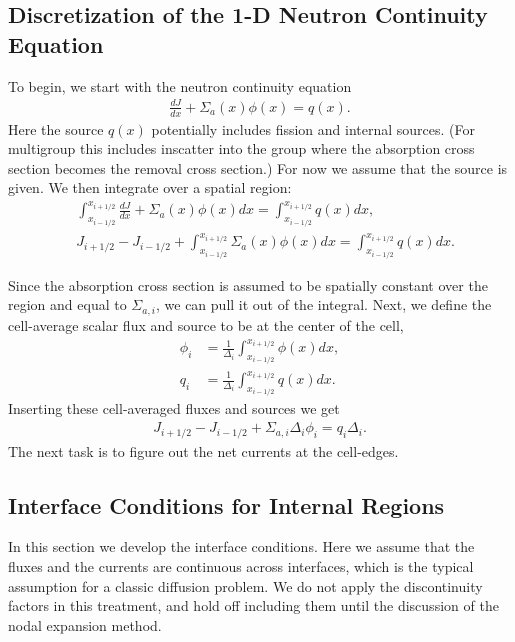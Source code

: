 \subsection{Discretization of the 1-D Neutron Continuity Equation}

To begin, we start with the neutron continuity equation
\begin{align}
  \frac{dJ}{dx} + \Sigma_a(x) \phi(x) = q(x) .
\end{align}
Here the source $q(x)$ potentially includes fission and internal sources. (For multigroup this includes inscatter into the group where the absorption cross section becomes the removal cross section.) For now we assume that the source is given. We then integrate over a spatial region:
\begin{align}
  &\int_{x_{i-1/2}}^{x_{i+1/2}} \frac{dJ}{dx} + \Sigma_a(x) \phi(x) dx = \int_{x_{i-1/2}}^{x_{i+1/2}} q(x) dx, \nonumber \\
  &J_{i+1/2} - J_{i-1/2} + \int_{x_{i-1/2}}^{x_{i+1/2}} \Sigma_a(x) \phi(x) dx = \int_{x_{i-1/2}}^{x_{i+1/2}} q(x) dx .
\end{align}

Since the absorption cross section is assumed to be spatially constant over the region and equal to $\Sigma_{a,i}$, we can pull it out of the integral. Next, we define the cell-average scalar flux and source to be at the center of the cell,
\begin{subequations}
\begin{align}
  \phi_i 	&= \frac{1}{\Delta_i} \int_{x_{i-1/2}}^{x_{i+1/2}} \phi(x) dx , \\
  q_i 		&= \frac{1}{\Delta_i} \int_{x_{i-1/2}}^{x_{i+1/2}} q(x) dx .
\end{align}
\end{subequations}
Inserting these cell-averaged fluxes and sources we get
\begin{align}
  J_{i+1/2} - J_{i-1/2} + \Sigma_{a,i} \Delta_i \phi_i = q_i \Delta_i .
\end{align}
The next task is to figure out the net currents at the cell-edges. 

\subsection{Interface Conditions for Internal Regions}

In this section we develop the interface conditions. Here we assume that the fluxes and the currents are continuous across interfaces, which is the typical assumption for a classic diffusion problem. We do not apply the discontinuity factors in this treatment, and hold off including them until the discussion of the nodal expansion method.

